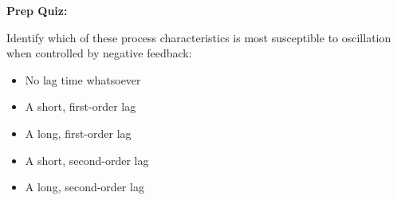 \vfil \eject

\noindent
{\bf Prep Quiz:}

Identify which of these process characteristics is most susceptible to oscillation when controlled by negative feedback:

\begin{itemize}
\item{} No lag time whatsoever
\vskip 5pt 
\item{} A short, first-order lag
\vskip 5pt 
\item{} A long, first-order lag
\vskip 5pt 
\item{} A short, second-order lag
\vskip 5pt 
\item{} A long, second-order lag
\end{itemize}




